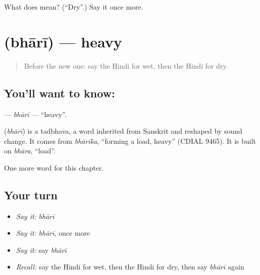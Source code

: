 \begin{tcolorbox}[breakable,colback=teal!4,colframe=teal!35!black,title={Before you move on}]
What does  mean? (\textquotedblleft{}Dry\textquotedblright{}.) Say it once more.
\end{tcolorbox}
\section[\texorpdfstring{\hi{भारी} (bhārī)}{भारी (bhārī)}]{ (bhārī) — heavy}

\label{lesson:HI-C154-bhari}



\begin{quote}
Before the new one: say the Hindi for wet, then the Hindi for dry.
\end{quote}

\subsection*{You'll want to know: }
\textbf{} — \emph{bhārī} — \textquotedblleft{}heavy\textquotedblright{}.

\begin{cousinweb}
\textbf{} (\emph{bhārī}) is a tadbhava, a word inherited from Sanskrit and reshaped by sound change. It comes from \emph{bhārika}, \textquotedblleft{}forming a load, heavy\textquotedblright{} (CDIAL 9465). It is built on \emph{bhāra}, \textquotedblleft{}load\textquotedblright{}.
\end{cousinweb}

\begin{grammarlens}[title={What you've built}]
One more word for this chapter.
\end{grammarlens}

\subsection*{Your turn}
\begin{itemize}
\raggedright
  \item \emph{Say it:} \emph{bhārī}
  \item \emph{Say it:} \emph{bhārī}, once more
  \item \emph{Say it:} say \emph{bhārī}
  \item \emph{Recall:} say the Hindi for wet, then the Hindi for dry, then say \emph{bhārī} again
\end{itemize}

